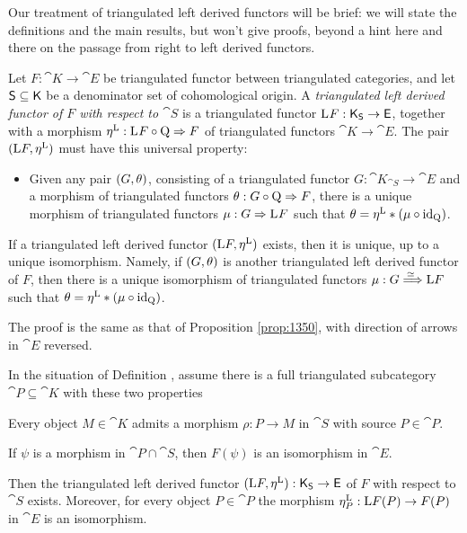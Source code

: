 Our treatment of triangulated left derived functors will be 
brief: we will state the definitions and the main results, but won't give 
proofs, beyond a hint here and there on the passage from right to left derived 
functors. 

\begin{dfn}  \label{dfn:1360}
Let $F : \cat{K} \to \cat{E}$ be triangulated functor between  
triangulated categories, and let 
$\operatorname{\mathsf{S}} \subseteq \operatorname{\mathsf{K}}$ be a denominator set of cohomological origin.    
A {\em triangulated left derived functor of $F$ with respect to $\cat{S}$} 
is a triangulated functor 
$\mathrm{L}^{} F : \operatorname{\mathsf{K}}_{\operatorname{\mathsf{S}}} \to \operatorname{\mathsf{E}}$,
together with a morphism 
$\eta^{\mathrm{L}} : \mathrm{L}^{} F \circ \operatorname{Q} \Rightarrow F$ 
of triangulated functors $\cat{K} \to \cat{E}$. The pair 
$(\mathrm{L} F, \eta^{\mathrm{L}})$ must have this universal property:
\begin{itemize}
\item[(L)] Given any pair $(G, \theta)$, consisting of a triangulated 
functor $G : \cat{K}_{\cat{S}} \to \cat{E}$ and a morphism of triangulated 
functors $\theta : G \circ \operatorname{Q} \Rightarrow F$, 
there is a unique morphism of triangulated functors 
$\mu : G \Rightarrow \mathrm{L}^{} F$
such that $\theta = \eta^{\mathrm{L}} * (\mu \circ \operatorname{id}_{\operatorname{Q}})$.
\end{itemize}
\end{dfn}

\begin{prop} \label{prop:1360}
If a triangulated left derived functor $(\mathrm{L} F, \eta^{\mathrm{L}})$ exists, 
then it is unique, up to a unique isomorphism. Namely, if  $(G, \theta)$ is 
another triangulated left derived functor of $F$, then there is a unique 
isomorphism of triangulated functors $\mu : G \stackrel{\simeq\ }{\Longrightarrow} \mathrm{L} F$ such that 
$\theta = \eta^{\mathrm{L}} * (\mu \circ \operatorname{id}_{\operatorname{Q}})$. 
\end{prop}

The proof is the same as that of Proposition \ref{prop:1350}, with direction of 
arrows in $\cat{E}$ reversed. 

\begin{thm} \label{thm:1500}
In the situation of Definition \tup{\ref{dfn:1360}}, 
assume there is a full triangulated subcategory 
$\cat{P} \subseteq \cat{K}$
with these two properties\tup{:}
\begin{enumerate}
 Every object $M \in \cat{K}$ admits a morphism 
$\rho : P \to M$ in $\cat{S}$ with source $P \in \cat{P}$.

 If $\psi$ is a morphism in $\cat{P} \cap \cat{S}$, 
then $F(\psi)$ is an isomorphism in $\cat{E}$.
\end{enumerate}
Then the triangulated left derived functor
$(\mathrm{L} F, \eta^{\mathrm{L}}) : \operatorname{\mathsf{K}}_{\operatorname{\mathsf{S}}} \to \operatorname{\mathsf{E}}$ 
of $F$ with respect to $\cat{S}$ exists. 
Moreover, for every object $P \in \cat{P}$ the morphism  
$\eta^{\mathrm{L}}_P : \mathrm{L} F(P) \to F(P)$
in $\cat{E}$ is an isomorphism.
\end{thm}

